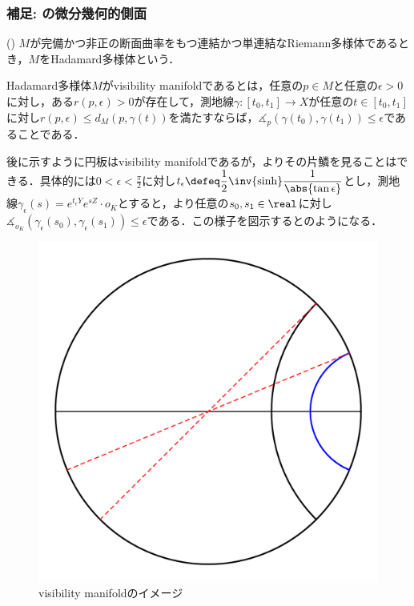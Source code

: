 \subsubsection{補足: の微分幾何的側面}
\begin{defi}({\cite[Definition~1.3]{e72-1}})\label{def:visibility}
  $M$が完備かつ非正の断面曲率をもつ連結かつ単連結なRiemann多様体であるとき，$M$をHadamard多様体という．

  Hadamard多様体$M$がvisibility manifoldであるとは，任意の$ p\in M$と任意の$ \epsilon > 0$に対し，ある$r(p,\epsilon) >0 $が存在して，測地線$\gamma\colon [t_0, t_1]\to X $が任意の$ t\in [t_0, t_1]$に対し$r(p,\epsilon) \leq d_{M}(p, \gamma(t))$を満たすならば，$\measuredangle_{p}(\gamma(t_0), \gamma(t_1)) \leq \epsilon $であることである．
\end{defi}

後に示すように{\Poincare}円板はvisibility manifoldであるが，よりその片鱗を見ることはできる．具体的には$ 0 <  \epsilon  < \frac{\pi}{2} $に対し$t_{\epsilon} \defeq \dfrac{1}{2}\inv{\sinh}\dfrac{1}{\abs{\tan \epsilon}} $とし，測地線$\gamma_{\epsilon}(s) = e^{t_{\epsilon} Y}e^{sZ}\cdot o_K $とすると，より任意の$s_0,s_1\in \real$に対し$\measuredangle_{o_K}(\gamma_{\epsilon} (s_0), \gamma_{\epsilon} (s_1)) \leq \epsilon $である．この様子を図示するとのようになる．

\begin{figure}[H]
  \centering
  \includegraphics[scale=0.3]{../graph/visibility-2.pdf}
  \caption{visibility manifoldのイメージ}
  \label{fig:visibility}
\end{figure}

